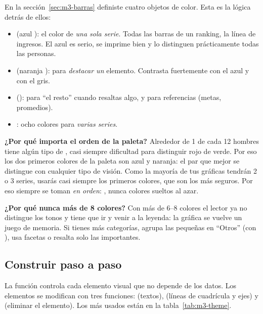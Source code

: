 En la sección~\ref{sec:m3-barras} definiste cuatro objetos de color. Esta es
la lógica detrás de ellos:

\begin{itemize}
  \item {} (azul ): el color de
        \emph{una sola serie}. Todas las barras de un ranking, la línea de
        ingresos. El azul es serio, se imprime bien y lo distinguen
        prácticamente todas las personas.
  \item {} (naranja ): para
        \emph{destacar un} elemento. Contrasta fuertemente con el azul y con
        el gris.
  \item {} (): para ``el resto'' cuando
        resaltas algo, y para referencias (metas, promedios).
  \item {}: ocho colores para \emph{varias series}.
\end{itemize}

\textbf{¿Por qué importa el orden de la paleta?} Alrededor de 1 de cada 12
hombres tiene algún tipo de , casi siempre dificultad
para distinguir rojo de verde. Por eso los dos primeros colores de la paleta
son azul y naranja: el par que mejor se distingue con cualquier tipo de
visión. Como la mayoría de tus gráficas tendrán 2 o 3 series, usarás casi
siempre los primeros colores, que son los más seguros. Por eso siempre se
toman \emph{en orden}: , nunca colores sueltos
al azar.

\textbf{¿Por qué nunca más de 8 colores?} Con más de 6--8 colores el lector
ya no distingue los tonos y tiene que ir y venir a la leyenda: la gráfica
se vuelve un juego de memoria. Si tienes más categorías, agrupa las
pequeñas en ``Otros'' (con ), usa facetas o resalta
solo las importantes.

\subsection{Construir \texorpdfstring{}{tema\_empresa()} paso a paso}

La función  controla cada elemento visual que no depende de
los datos. Los elementos se modifican con tres funciones:
 (textos),  (líneas de
cuadrícula y ejes) y  (eliminar el elemento). Los
más usados están en la tabla~\ref{tab:m3-theme}.

